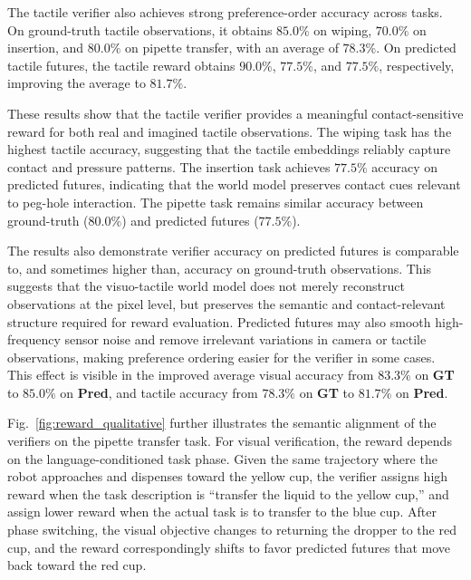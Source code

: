 The tactile verifier also achieves strong preference-order accuracy across tasks. On ground-truth tactile observations, it obtains $85.0\%$ on wiping, $70.0\%$ on insertion, and $80.0\%$ on pipette transfer, with an average of $78.3\%$. On predicted tactile futures, the tactile reward obtains $90.0\%$, $77.5\%$, and $77.5\%$, respectively, improving the average to $81.7\%$.

These results show that the tactile verifier provides a meaningful contact-sensitive reward for both real and imagined tactile observations. The wiping task has the highest tactile accuracy, suggesting that the tactile embeddings reliably capture contact and pressure patterns. The insertion task achieves $77.5\%$ accuracy on predicted futures, indicating that the world model preserves contact cues relevant to peg-hole interaction. The pipette task remains similar accuracy between ground-truth ($80.0\%$) and predicted futures ($77.5\%$).

The results also demonstrate verifier accuracy on predicted futures is comparable to, and sometimes higher than, accuracy on ground-truth observations. This suggests that the visuo-tactile world model does not merely reconstruct observations at the pixel level, but preserves the semantic and contact-relevant structure required for reward evaluation. Predicted futures may also smooth high-frequency sensor noise and remove irrelevant variations in camera or tactile observations, making preference ordering easier for the verifier in some cases. This effect is visible in the improved average visual accuracy from $83.3\%$ on \textbf{GT} to $85.0\%$ on \textbf{Pred}, and tactile accuracy from $78.3\%$ on \textbf{GT} to $81.7\%$ on \textbf{Pred}.

Fig.~\ref{fig:reward_qualitative} further illustrates the semantic alignment of the verifiers on the pipette transfer task. For visual verification, the reward depends on the language-conditioned task phase. Given the same trajectory where the robot approaches and dispenses toward the yellow cup, the verifier assigns high reward when the task description is ``transfer the liquid to the yellow cup,'' and assign lower reward when the actual task is to transfer to the blue cup. After phase switching, the visual objective changes to returning the dropper to the red cup, and the reward correspondingly shifts to favor predicted futures that move back toward the red cup.

